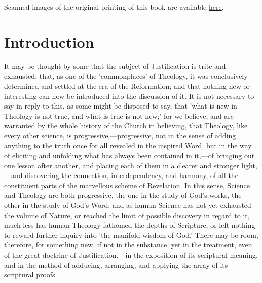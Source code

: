 \documentclass[
]{book}
\begin{document}
Scanned images of the original printing of this book are available \href{https://archive.org/details/doctrinejustifi00buchgoog/mode/2up}{here}.

\clearpage
\setcounter{page}{1}

\hypertarget{introduction}{%
\chapter{Introduction}\label{introduction}}

It may be thought by some that the subject of Justification is trite and exhausted; that, as one of the 'commonplaces' of Theology, it was conclusively determined and settled at the era of the Reformation; and that nothing new or interesting can now be introduced into the discussion of it. It is not necessary to say in reply to this, as some might be disposed to say, that 'what is new in Theology is not true, and what is true is not new;' for we believe, and are warranted by the whole history of the Church in believing, that Theology, like every other science, is progressive,---progressive, not in the sense of adding anything to the truth once for all revealed in the inspired Word, but in the way of eliciting and unfolding what has always been contained in it,---of bringing out one lesson after another, and placing each of them in a clearer and stronger light,---and discovering the connection, interdependency, and harmony, of all the constituent parts of the marvellous scheme of Revelation. In this sense, Science and Theology are both progressive, the one in the study of God's works, the other in the study of God's Word; and as human Science has not yet exhausted the volume of Nature, or reached the limit of possible discovery in regard to it, much less has human Theology fathomed the depths of Scripture, or left nothing to reward further inquiry into 'the manifold wisdom of God.' There may be room, therefore, for something new, if not in the substance, yet in the treatment, even of the great doctrine of Justification,---in the exposition of its scriptural meaning, and in the method of adducing, arranging, and applying the array of its scriptural proofs.
\end{document}
